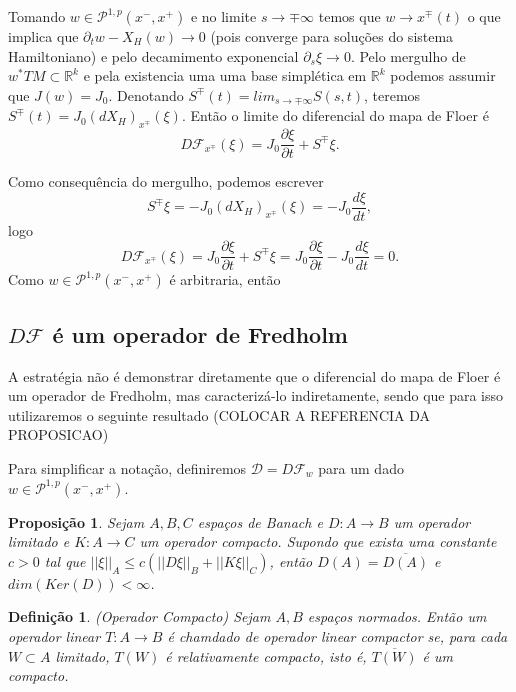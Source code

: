 \documentclass[12pt]{book}
\newtheorem{definicao}[teorema]{Definição}
\newtheorem{proposicao}[teorema]{Proposição}
\newcommand{\caminhosexponenciaisconectantes}[2]{\mathcal{P}^{1,p}(#1, #2)}
\newcommand{\caminhosexponenciaisconectantespadrao}{\caminhosexponenciaisconectantes{x^{-}}{x^{+}}}
\newcommand{\campohamiltoniano}[1]{X_{H}(#1)}
\newcommand{\diferebcialmapafloerabrev}{\mathcal{D}}
\newcommand{\derivada}[2]{\frac{d #1}{d #2}}
\newcommand{\derivadaparcial}[2]{\frac{\partial #1}{\partial #2}}
\newcommand{\derivadaparcialabrev}[1]{\partial_{#1}}
\newcommand{\diferencialhamiltoniano}[1]{(dX_{H})_{#1}}
\newcommand{\estruturacomplexa}{J_{0}}
\newcommand{\mapafloer}{\mathcal{F}}
\newcommand{\norma}[1]{||#1||}
\newcommand{\normasubscrito}[2]{\norma{#1}_{#2}}
\newcommand{\pullbackfibradotangente}[2]{#1^{*}T#2}
\newcommand{\pullbackfibradotangenteM}[1]{\pullbackfibradotangente{#1}{M}}
\newcommand{\real}[1]{\mathbb{R}^{#1}}
\newcommand{\vermelho}[1]{{\color{red}#1}}
\begin{document}
	Tomando $w\in \caminhosexponenciaisconectantespadrao$ e no limite $s\to \mp\infty$ temos que $w \to x^{\mp}(t)$ o que implica que $\derivadaparcialabrev{t}w - \campohamiltoniano{w}\to 0$ (pois converge para soluções do sistema Hamiltoniano) e pelo decamimento exponencial $\derivadaparcialabrev{s}\xi \to 0$. Pelo mergulho de $\pullbackfibradotangenteM{w} \subset \real{k}$ e pela existencia uma uma base simplética em $\real{k}$ podemos assumir que $J(w) = \estruturacomplexa$. Denotando $S^{\mp}(t) = lim_{s\to \mp \infty}S(s,t)$, teremos $S^{\mp}(t) = \estruturacomplexa\diferencialhamiltoniano{x^{\mp}}(\xi)$. Então o limite do diferencial do mapa de Floer é
	$$
	D\mapafloer_{x^{\mp}}(\xi) =  \estruturacomplexa\derivadaparcial{\xi}{t}+ S^{\mp}\xi.
	$$
	
	Como consequência do mergulho, podemos escrever
	$$
	S^{\mp}\xi = -\estruturacomplexa\diferencialhamiltoniano{x^{\mp}}(\xi) = -\estruturacomplexa\derivada{\xi}{t},
	$$
	logo
	$$
		D\mapafloer_{x^{\mp}}(\xi) =  \estruturacomplexa\derivadaparcial{\xi}{t}+ S^{\mp}\xi =
		 \estruturacomplexa\derivadaparcial{\xi}{t} -\estruturacomplexa\derivada{\xi}{t}
		=0.
	$$
	Como $w \in \caminhosexponenciaisconectantespadrao$ é arbitraria, então 
	 
	\subsection{$D\mapafloer$ é um operador de Fredholm}
	A estratégia não é demonstrar diretamente que o diferencial do mapa de Floer é um operador de Fredholm, mas caracterizá-lo indiretamente, sendo que para isso utilizaremos o seguinte resultado  \vermelho{(COLOCAR A REFERENCIA DA PROPOSICAO)}

	Para simplificar a notação, definiremos $\diferebcialmapafloerabrev = D\mapafloer_{w}$ para um dado $w\in \caminhosexponenciaisconectantespadrao$.
	
	\begin{proposicao}
		Sejam $A,B,C$ espaços de Banach e $D:A\to B$ um operador limitado e $K:A \to C$ um operador compacto. Supondo que exista uma constante $c>0$ tal que $\normasubscrito{\xi}{A} \leq c(\normasubscrito{D\xi}{B} + \normasubscrito{K\xi}{C})$, então $D(A) = \overline{D(A)}$ e $dim(Ker(D)) <\infty$.
	\end{proposicao}
	
	\begin{definicao}\label{definicao_operador_compacto}
		(Operador Compacto) Sejam $A, B$ espaços normados. Então um operador linear $T:A\to B$ é chamdado de operador linear compactor se, para cada $W \subset A$ limitado, $T(W)$ é relativamente compacto, isto é, $\overline{T(W)} $ é um compacto.
	\end{definicao}
	
\end{document}
